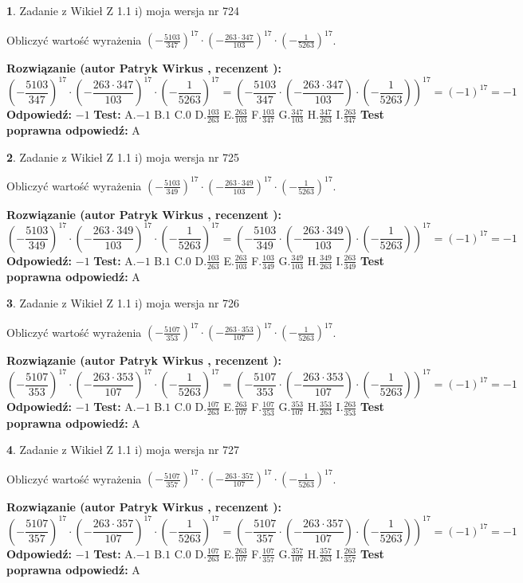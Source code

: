 \documentclass[12pt, a4paper]{article}
\theoremstyle{definition} %
\newtheorem{zad}{}
\newcommand{\zadStart}[1]{\begin{zad}#1\newline}
\newcommand{\zadStop}{\end{zad}}
\newcommand{\rozwStart}[2]{\noindent \textbf{Rozwiązanie (autor #1 , recenzent #2): }\newline}
\newcommand{\rozwStop}{\newline}
\newcommand{\odpStart}{\noindent \textbf{Odpowiedź:}\newline}
\newcommand{\odpStop}{\newline}
\newcommand{\testStart}{\noindent \textbf{Test:}\newline}
\newcommand{\testStop}{\newline}
\newcommand{\kluczStart}{\noindent \textbf{Test poprawna odpowiedź:}\newline}
\newcommand{\kluczStop}{\newline}
\begin{document}
\zadStart{Zadanie z Wikieł Z 1.1 i) moja wersja nr 724}

Obliczyć wartość wyrażenia $(-\frac{5103}{347})^{17} \cdot (-\frac{263 \cdot 347}{103})^{17} \cdot (-\frac{1}{5263})^{17}$.
\zadStop
\rozwStart{Patryk Wirkus}{}
$$(-\frac{5103}{347})^{17} \cdot (-\frac{263 \cdot 347}{103})^{17} \cdot (-\frac{1}{5263})^{17} = (-\frac{5103}{347} \cdot (-\frac{263 \cdot 347}{103}) \cdot (-\frac{1}{5263}))^{17} = (-1)^{17} = -1$$
\rozwStop
\odpStart
$-1$
\odpStop
\testStart
A.$-1$ B.$1$ C.$0$ D.$\frac{103}{263}$ E.$\frac{263}{103}$
F.$\frac{103}{347}$ G.$\frac{347}{103}$
H.$\frac{347}{263}$
I.$\frac{263}{347}$
\testStop
\kluczStart
A
\kluczStop



\zadStart{Zadanie z Wikieł Z 1.1 i) moja wersja nr 725}

Obliczyć wartość wyrażenia $(-\frac{5103}{349})^{17} \cdot (-\frac{263 \cdot 349}{103})^{17} \cdot (-\frac{1}{5263})^{17}$.
\zadStop
\rozwStart{Patryk Wirkus}{}
$$(-\frac{5103}{349})^{17} \cdot (-\frac{263 \cdot 349}{103})^{17} \cdot (-\frac{1}{5263})^{17} = (-\frac{5103}{349} \cdot (-\frac{263 \cdot 349}{103}) \cdot (-\frac{1}{5263}))^{17} = (-1)^{17} = -1$$
\rozwStop
\odpStart
$-1$
\odpStop
\testStart
A.$-1$ B.$1$ C.$0$ D.$\frac{103}{263}$ E.$\frac{263}{103}$
F.$\frac{103}{349}$ G.$\frac{349}{103}$
H.$\frac{349}{263}$
I.$\frac{263}{349}$
\testStop
\kluczStart
A
\kluczStop



\zadStart{Zadanie z Wikieł Z 1.1 i) moja wersja nr 726}

Obliczyć wartość wyrażenia $(-\frac{5107}{353})^{17} \cdot (-\frac{263 \cdot 353}{107})^{17} \cdot (-\frac{1}{5263})^{17}$.
\zadStop
\rozwStart{Patryk Wirkus}{}
$$(-\frac{5107}{353})^{17} \cdot (-\frac{263 \cdot 353}{107})^{17} \cdot (-\frac{1}{5263})^{17} = (-\frac{5107}{353} \cdot (-\frac{263 \cdot 353}{107}) \cdot (-\frac{1}{5263}))^{17} = (-1)^{17} = -1$$
\rozwStop
\odpStart
$-1$
\odpStop
\testStart
A.$-1$ B.$1$ C.$0$ D.$\frac{107}{263}$ E.$\frac{263}{107}$
F.$\frac{107}{353}$ G.$\frac{353}{107}$
H.$\frac{353}{263}$
I.$\frac{263}{353}$
\testStop
\kluczStart
A
\kluczStop



\zadStart{Zadanie z Wikieł Z 1.1 i) moja wersja nr 727}

Obliczyć wartość wyrażenia $(-\frac{5107}{357})^{17} \cdot (-\frac{263 \cdot 357}{107})^{17} \cdot (-\frac{1}{5263})^{17}$.
\zadStop
\rozwStart{Patryk Wirkus}{}
$$(-\frac{5107}{357})^{17} \cdot (-\frac{263 \cdot 357}{107})^{17} \cdot (-\frac{1}{5263})^{17} = (-\frac{5107}{357} \cdot (-\frac{263 \cdot 357}{107}) \cdot (-\frac{1}{5263}))^{17} = (-1)^{17} = -1$$
\rozwStop
\odpStart
$-1$
\odpStop
\testStart
A.$-1$ B.$1$ C.$0$ D.$\frac{107}{263}$ E.$\frac{263}{107}$
F.$\frac{107}{357}$ G.$\frac{357}{107}$
H.$\frac{357}{263}$
I.$\frac{263}{357}$
\testStop
\kluczStart
A
\kluczStop
\end{document}
